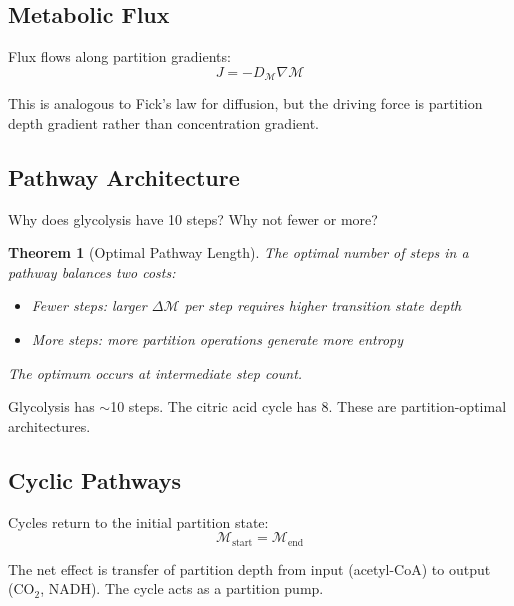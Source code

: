 \documentclass[twocolumn,10pt,a4paper]{article}
\newtheorem{theorem}{Theorem}[section]
\theoremstyle{definition}
\theoremstyle{remark}
\newcommand{\Depth}{\mathcal{M}}
\begin{document}
\subsection{Metabolic Flux}

Flux flows along partition gradients:
\begin{equation}
    J = -D_{\Depth} \nabla\Depth
\end{equation}

This is analogous to Fick's law for diffusion, but the driving force is partition depth gradient rather than concentration gradient.

\subsection{Pathway Architecture}

Why does glycolysis have 10 steps? Why not fewer or more?

\begin{theorem}[Optimal Pathway Length]
\label{thm:pathway}
The optimal number of steps in a pathway balances two costs:
\begin{itemize}
    \item Fewer steps: larger $\Delta\Depth$ per step requires higher transition state depth
    \item More steps: more partition operations generate more entropy
\end{itemize}
The optimum occurs at intermediate step count.
\end{theorem}

Glycolysis has $\sim$10 steps. The citric acid cycle has 8. These are partition-optimal architectures.

\subsection{Cyclic Pathways}

Cycles return to the initial partition state:
\begin{equation}
    \Depth_{\mathrm{start}} = \Depth_{\mathrm{end}}
\end{equation}

The net effect is transfer of partition depth from input (acetyl-CoA) to output (CO$_2$, NADH). The cycle acts as a partition pump.
\end{document}
